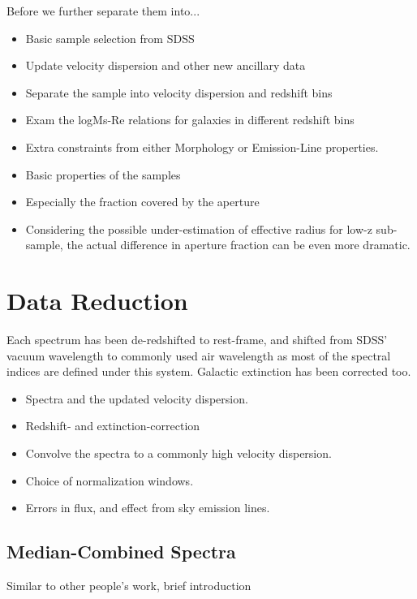\documentclass[preprint]{aastex}
\begin{document}
\begin{CJK*}{UTF8}{gbsn}
  Before we further separate them into...

  \begin{itemize}
      \item Basic sample selection from SDSS 
      \item Update velocity dispersion and other new ancillary data 
      \item Separate the sample into velocity dispersion and redshift bins 
      \item Exam the logMs-Re relations for galaxies in different redshift bins 
      \item Extra constraints from either Morphology or Emission-Line properties. 
      \item Basic properties of the samples 
      \item Especially the fraction covered by the aperture 
      \item Considering the possible under-estimation of effective radius for low-z 
    sub-sample, the actual difference in aperture fraction can be even more 
    dramatic.  
  \end{itemize}

\section{Data Reduction} 

  Each spectrum has been de-redshifted to rest-frame, and shifted from 
  SDSS' vacuum wavelength to commonly used air wavelength as most of the 
  spectral indices are defined under this system.  Galactic extinction has 
  been corrected too.  

  \begin{itemize}
      \item Spectra and the updated velocity dispersion. 
      \item Redshift- and extinction-correction 
      \item Convolve the spectra to a commonly high velocity dispersion. 
      \item Choice of normalization windows. 
      \item Errors in flux, and effect from sky emission lines.
  \end{itemize}

\subsection{Median-Combined Spectra}

Similar to other people's work, brief introduction 


\end{CJK*}
\end{document}
